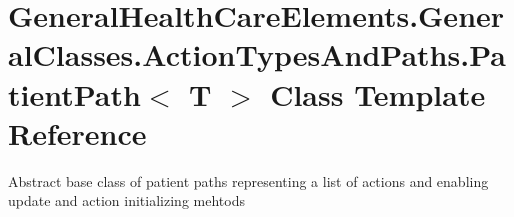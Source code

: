 \hypertarget{class_general_health_care_elements_1_1_general_classes_1_1_action_types_and_paths_1_1_patient_path}{}\section{General\+Health\+Care\+Elements.\+General\+Classes.\+Action\+Types\+And\+Paths.\+Patient\+Path$<$ T $>$ Class Template Reference}
\label{class_general_health_care_elements_1_1_general_classes_1_1_action_types_and_paths_1_1_patient_path}


Abstract base class of patient paths representing a list of actions and enabling update and action initializing mehtods  


